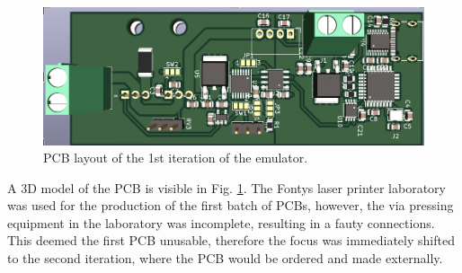 \begin{figure}[h]
    \centering
    \includegraphics[scale=0.45]{pcb_1st_iteration.png}
    \caption{PCB layout of the 1st iteration of the emulator.}
    \label{fig:1st_pcb}
\end{figure}

A 3D model of the PCB is visible in Fig. \ref{fig:1st_pcb}.
The Fontys laser printer laboratory was used for the production 
of the first batch of PCBs, however, the via pressing equipment in the 
laboratory was incomplete, resulting in a fauty connections. 
This deemed the first PCB unusable, therefore the focus was 
immediately shifted to the second iteration, where the PCB 
would be ordered and made externally.
